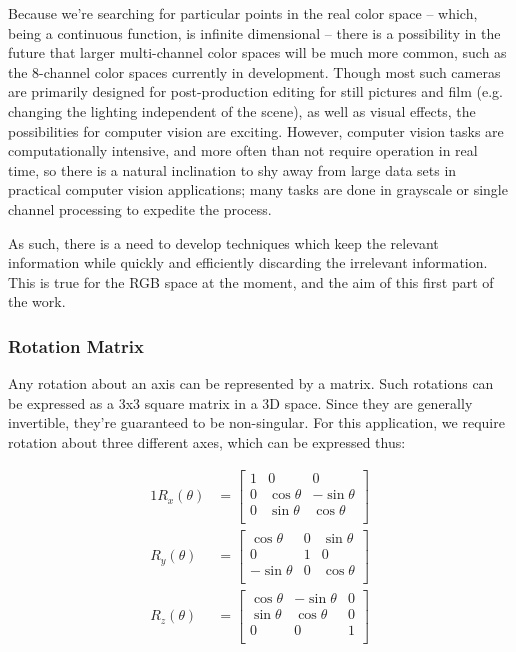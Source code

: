 \documentclass[10pt,a4paper]{article}
\begin{document}
Because we're searching for particular points in the real color space -- which, being a continuous function, is infinite dimensional -- there is a possibility in the future that larger multi-channel color spaces will be much more common, such as the 8-channel color spaces currently in development. Though most such cameras are primarily designed for post-production editing for still pictures and film (e.g. changing the lighting independent of the scene), as well as visual effects, the possibilities for computer vision are exciting. However, computer vision tasks are computationally intensive, and more often than not require operation in real time, so there is a natural inclination to shy away from large data sets in practical computer vision applications; many tasks are done in grayscale or single channel processing to expedite the process.

As such, there is a need to develop techniques which keep the relevant information while quickly and efficiently discarding the irrelevant information. This is true for the RGB space at the moment, and the aim of this first part of the work.


\subsubsection{Rotation Matrix}\label{sec:RotationMatrix}

Any rotation about an axis can be represented by a matrix. Such rotations can be expressed as a 3x3 square matrix in a 3D space. Since they are generally invertible, they're guaranteed to be non-singular. For this application, we require rotation about three different axes, which can be expressed thus:


\begin{alignat}{1}
R_x(\theta) &= \begin{bmatrix}
1 & 0 & 0 \\
0 & \cos \theta &  -\sin \theta \\[3pt]
0 & \sin \theta  &  \cos \theta \\[3pt]
\end{bmatrix} \\[6pt]
R_y(\theta) &= \begin{bmatrix}
\cos \theta & 0 & \sin \theta \\[3pt]
0 & 1 & 0 \\[3pt]
-\sin \theta & 0 & \cos \theta \\
\end{bmatrix} \\[6pt]
R_z(\theta) &= \begin{bmatrix}
\cos \theta &  -\sin \theta & 0 \\[3pt]
\sin \theta & \cos \theta & 0\\[3pt]
0 & 0 & 1\\
\end{bmatrix}
\end{alignat}
\end{document}
